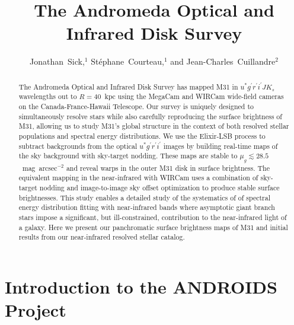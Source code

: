 \documentclass[11pt,twoside]{article}
\begin{document}
\title{The Andromeda Optical and Infrared Disk Survey}
\author{Jonathan~Sick,$^1$ St\'{e}phane~Courteau,$^1$ and Jean-Charles~Cuillandre$^2$}

\begin{abstract}
The Andromeda Optical and Infrared Disk Survey has mapped M31 in $u^* g^\prime r^\prime i^\prime J K_s$ wavelengths out to $R=40$~kpc using the MegaCam and WIRCam wide-field cameras on the Canada-France-Hawaii Telescope.
Our survey is uniquely designed to simultaneously resolve stars while also carefully reproducing the surface brightness of M31, allowing us to study M31's global structure in the context of both resolved stellar populations and spectral energy distributions.
We use the Elixir-LSB process to subtract backgrounds from the optical $u^* g^\prime r^\prime i^\prime$ images by building real-time maps of the sky background with sky-target nodding.
These maps are stable to $\mu_g \lesssim 28.5$~mag~arcsec$^{-2}$ and reveal warps in the outer M31 disk in surface brightness.
The equivalent mapping in the near-infrared with WIRCam uses a combination of sky-target nodding and image-to-image sky offset optimization to produce stable surface brightnesses.
This study enables a detailed study of the systematics of of spectral energy distribution fitting with near-infrared bands where asymptotic giant branch stars impose a significant, but ill-constrained, contribution to the near-infrared light of a galaxy.
Here we present our panchromatic surface brightness maps of M31 and initial results from our near-infrared resolved stellar catalog.
\end{abstract}

\section{Introduction to the ANDROIDS Project}
\end{document}
